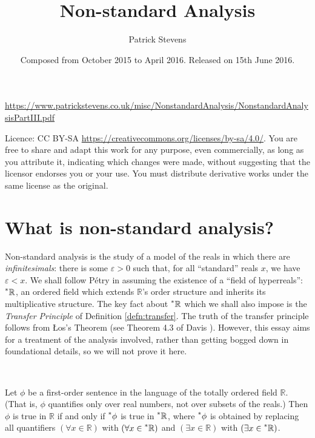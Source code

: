 \documentclass[11pt]{amsart}
\title{Non-standard Analysis}
\author{Patrick Stevens}
\date{Composed from October 2015 to April 2016. Released on 15th June 2016.}
\theoremstyle{remark}
\newcommand{\hyp}[1][\mathbb{R}]{\prescript{*}{}{#1}}
\begin{document}
\maketitle
\tiny \begin{center} \url{https://www.patrickstevens.co.uk/misc/NonstandardAnalysis/NonstandardAnalysisPartIII.pdf} \end{center}
Licence: CC BY-SA \url{https://creativecommons.org/licenses/by-sa/4.0/}.
You are free to share and adapt this work for any purpose, even commercially, as long as you attribute it, indicating which changes were made, without suggesting that the licensor endorses you or your use.
You must distribute derivative works under the same license as the original.
\normalsize
\pagebreak

\tableofcontents
\section{What is non-standard analysis?}

Non-standard analysis is the study of a model of the reals in which there are \emph{infinitesimals}: there is some $\varepsilon > 0$ such that, for all ``standard'' reals $x$, we have $\varepsilon < x$.
We shall follow P\'{e}try \cite{petry} in assuming the existence of a ``field of hyperreals'': $\hyp$, an ordered field which extends $\mathbb{R}$'s order structure and inherits its multiplicative structure.
The key fact about $\hyp$ which we shall also impose is the \emph{Transfer Principle} of Definition \ref{defn:transfer}.
The truth of the transfer principle follows from \L os's Theorem (see Theorem 4.3 of Davis \cite{davis}).
However, this essay aims for a treatment of the analysis involved, rather than getting bogged down in foundational details, so we will not prove it here.

\

\begin{defn} \label{defn:transfer}
Let $\phi$ be a first-order sentence in the language of the totally ordered field $\mathbb{R}$.
(That is, $\phi$ quantifies only over real numbers, not over subsets of the reals.)
Then $\phi$ is true in $\mathbb{R}$ if and only if $\hyp[\phi]$ is true in $\hyp$, where $\hyp[\phi]$ is obtained by replacing all quantifiers $(\forall x \in \mathbb{R})$ with $(\forall x \in \hyp)$ and $(\exists x \in \mathbb{R})$ with $(\exists x \in \hyp)$.
\end{defn}

\
\end{document}
